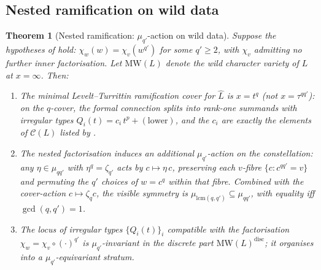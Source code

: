 \documentclass[11pt,a4paper]{article}
\theoremstyle{plain}
\newtheorem{theorem}{Theorem}[section]
\theoremstyle{definition}
\theoremstyle{remark}
\newcommand{\Cl}{\mathcal{C}}
\newcommand{\MW}{\mathrm{MW}}
\begin{document}
\subsection{Nested ramification on wild data}\label{ssec:AT3}

\begin{theorem}[Nested ramification: $\mu_{q'}$-action on wild data]\label{thm:AT3}
Suppose the hypotheses of  hold: $\chi_w(w) = \chi_v(w^{q'})$
for some $q' \ge 2$, with $\chi_v$ admitting no further inner factorisation.
Let $\MW(L)$ denote the wild character variety of $L$ at $x = \infty$.
Then:
\begin{enumerate}[leftmargin=2em]
\item The minimal Levelt--Turrittin ramification cover for $\widehat{L}$
      is $x = t^q$ (not $x = \tau^{qq'}$): on the $q$-cover, the formal
      connection splits into rank-one summands with irregular types
      $Q_i(t) = c_i\, t^p + (\text{lower})$, and the $c_i$ are exactly
      the elements of $\Cl(L)$ listed by .
\item The nested factorisation induces an \emph{additional}
      $\mu_{q'}$-action on the constellation: any $\eta \in \mu_{qq'}$
      with $\eta^q = \zeta_{q'}$ acts by $c \mapsto \eta\, c$, preserving
      each $v$-fibre $\{c : c^{qq'} = v\}$ and permuting the $q'$ choices
      of $w = c^q$ within that fibre. Combined with the cover-action
      $c \mapsto \zeta_q c$, the visible symmetry is $\mu_{\mathrm{lcm}(q,
      q')} \subseteq \mu_{qq'}$, with equality iff $\gcd(q, q') = 1$.
\item The locus of irregular types $\{Q_i(t)\}_i$ compatible with the
      factorisation $\chi_w = \chi_v \circ (\cdot)^{q'}$ is
      $\mu_{q'}$-invariant in the discrete part $\MW(L)^{\mathrm{disc}}$;
      it organises into a $\mu_{q'}$-equivariant stratum.
\end{enumerate}
\end{theorem}
\end{document}
